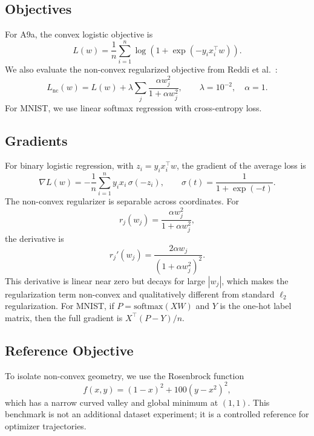 \documentclass{article}
\begin{document}
\subsection{Objectives}
For A9a, the convex logistic objective is
\begin{equation}
    L(w)=\frac{1}{n}\sum_{i=1}^n \log(1+\exp(-y_i x_i^\top w)).
\end{equation}
We also evaluate the non-convex regularized objective from Reddi et al.~\citep{reddi2016fast}:
\begin{equation}
    L_{\mathrm{nc}}(w)=L(w)+\lambda\sum_j\frac{\alpha w_j^2}{1+\alpha w_j^2},
    \qquad \lambda=10^{-2},\quad \alpha=1.
\end{equation}
For MNIST, we use linear softmax regression with cross-entropy loss.

\subsection{Gradients}
For binary logistic regression, with $z_i=y_i x_i^\top w$, the gradient of the average loss is
\begin{equation}
    \nabla L(w)= -\frac{1}{n}\sum_{i=1}^n y_i x_i \,\sigma(-z_i),
    \qquad \sigma(t)=\frac{1}{1+\exp(-t)}.
\end{equation}
The non-convex regularizer is separable across coordinates. For
\begin{equation}
    r_j(w_j)=\frac{\alpha w_j^2}{1+\alpha w_j^2},
\end{equation}
the derivative is
\begin{equation}
    r_j'(w_j)=\frac{2\alpha w_j}{(1+\alpha w_j^2)^2}.
\end{equation}
This derivative is linear near zero but decays for large $|w_j|$, which makes the regularization term non-convex and qualitatively different from standard $\ell_2$ regularization. For MNIST, if $P=\mathrm{softmax}(XW)$ and $Y$ is the one-hot label matrix, then the full gradient is $X^\top(P-Y)/n$.

\subsection{Reference Objective}
To isolate non-convex geometry, we use the Rosenbrock function~\citep{rosenbrock1960automatic}
\begin{equation}
    f(x,y)=(1-x)^2+100(y-x^2)^2,
\end{equation}
which has a narrow curved valley and global minimum at $(1,1)$. This benchmark is not an additional dataset experiment; it is a controlled reference for optimizer trajectories.
\end{document}
